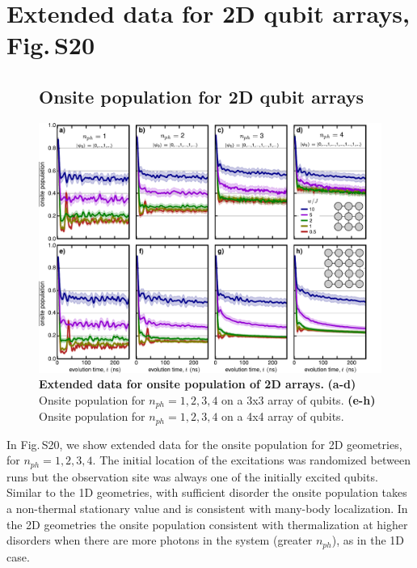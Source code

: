 \section{Extended data for 2D qubit arrays, Fig.\,S20}
\begin{figure}[tbh]
\subsection{Onsite population for 2D qubit arrays}
\centering
\includegraphics[width=175mm, keepaspectratio]{./PDF/population_2d_190915_1018a.pdf}
\caption{\textbf{Extended data for onsite population of 2D arrays.}
\textbf{(a-d)} Onsite population for $n_{ph} = 1,2,3,4$ on a 3x3 array of qubits.
\textbf{(e-h)} Onsite population for $n_{ph} = 1,2,3,4$ on a 4x4 array of qubits.}
\end{figure}

In Fig.\,S20, we show extended data for the onsite population for 2D geometries, for $n_{ph}=1,2,3,4$.  The initial location of the excitations was randomized between runs but the observation site was always one of the initially excited qubits.  Similar to the 1D geometries, with sufficient disorder the onsite population takes a non-thermal stationary value and is consistent with many-body localization.  In the 2D geometries the onsite population consistent with thermalization at higher disorders when there are more photons in the system (greater $n_{ph}$), as in the 1D case.

\printbibliography

